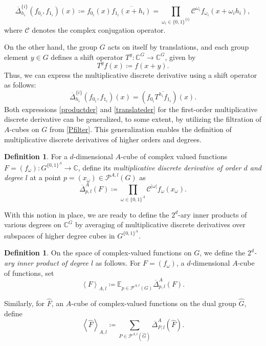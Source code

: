 \documentclass{amsart}
\theoremstyle{definition}
\newtheorem{definition}[theorem]{Definition}
\theoremstyle{remark}
\numberwithin{equation}{section}
\begin{document}
\begin{equation}
\label{productder}
    \overline{\Delta}^{\{i\}}_{h_i} (f_{0_i},f_{1_i})(x) \coloneqq f_{0_i}(x)\overline{f_{1_i}(x+h_i)}= \prod_{\omega_i \in \{0,1\}^{\{i\}}} \mathcal{C}^{\omega_i}f_{\omega_i}(x + \omega_i h_i),
\end{equation}
where $\mathcal{C}$ denotes the complex conjugation operator.

On the other hand, the group $G$ acts on itself by translations, and each group element $y\in G$ defines a shift operator $T^y:\mathbb{C}^G \to \mathbb{C}^G$, given by 
$$T^y f(x) \coloneqq f(x + y).$$
Thus, we can express the multiplicative discrete derivative using a shift operator as follows:
\begin{equation}
\label{translateder}    
  \overline{\Delta}^{\{i\}}_{h_i} (f_{0_i},f_{1_i})(x) = \left(f_{0_i}\overline{T^{h_i} f_{1_i}}\right)(x). 
\end{equation}
Both expressions \eqref{productder} and \eqref{translateder} for the first-order multiplicative discrete derivative can be generalized, to some extent, by utilizing the filtration of $A$-cubes on $G$  from \eqref{Pfilter}. This generalization enables the definition of multiplicative discrete derivatives of higher orders and degrees.
 
\begin{definition}
For a $d$-dimensional $A$-cube of complex valued functions $F =(f_\omega) : G^{\{0,1\}^A} \to \mathbb{C}$,  define its {\it multiplicative discrete derivative of order $d$ and degree $l$} at a point 
$p =\left( x_\omega \right) \in \mathcal{P}^{A,l}(G)$ as 
\begin{equation}\label{disc_der}
 \overline{\Delta}^A_{p,l} (F)  \coloneqq \prod_{\omega \in \{0,1\}^A} \mathcal{C}^{|\omega|} f_\omega (x_\omega).
\end{equation}

\end{definition}


With this notion in place, we are ready to define the $2^d$-ary inner products of various degrees on $\mathbb{C}^G$ by averaging of multiplicative discrete derivatives over subspaces of higher degree cubes in $G^{\{0,1\} ^A}$. 

\begin{definition}\label{def:in_prod}
On the space of complex-valued functions on $G$, we define the {\it $2^d$-ary inner product of degree $l$ } as follows.  For $F=(f_\omega)$, a $d$-dimensional $A$-cube of  functions, set 
\begin{equation}\label{in_prod_G}
\left\langle F \right\rangle_{A,l} \coloneqq \mathbb{E}_{p \in \mathcal{P}^{A,l}(G)} \overline{\Delta}^A_{p,l} (F).
\end{equation}



Similarly, for $\widehat{F}$, an $A$-cube of complex-valued functions on the dual group $\widehat{G}$, define
\begin{equation}\label{in_prod_hatG}
\left\langle \widehat{F} \right\rangle_{A,l} \coloneqq \sum_{P \in \mathcal{P}^{A,l}(\widehat{G})} \overline{\Delta}^A_{P,l} (\widehat{F}).
\end{equation}
\end{definition}
\end{document}
